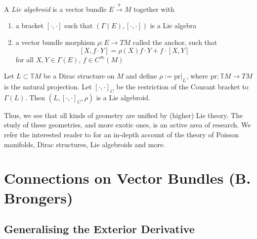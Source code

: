 \begin{definition}
  A \emph{Lie algebroid} is a vector bundle $E\xrightarrow{\pi}M$ together with
  \begin{enumerate}
      \item a bracket $[\cdot,\cdot]$ such that $(\Gamma(E),[\cdot,\cdot])$ is a Lie algebra
      \item a vector bundle morphism $\rho:E\to TM$ called the anchor, such that 
      $$[X,f\cdot Y]=\rho(X)f\cdot Y+f\cdot[X,Y]$$ 
      for all $X,Y\in\Gamma(E)$, $f\in C^\infty(M)$
  \end{enumerate}
\end{definition}
\begin{example}
  Let $L\subset\mathbb{T}M$ be a Dirac structure on $M$ and define $\rho:=\text{pr}|_L$, where $\text{pr}:\mathbb{T}M\to TM$ is the natural projection. Let $[\cdot,\cdot]_C$ be the restriction of the Courant bracket to $\Gamma(L)$. Then $(L,[\cdot,\cdot]_C,\rho)$ is a Lie algebroid.
\end{example}
Thus, we see that all kinds of geometry are unified by (higher) Lie theory. The study of these geometries, and more exotic ones, is an active area of research. We refer the interested reader to \cite{Crainic_2021} for an in-depth account of the theory of Poisson manifolds, Dirac structures, Lie algebroids and more.

\chapter{Connections on Vector Bundles (B. Brongers)}

\section{Generalising the Exterior Derivative}

